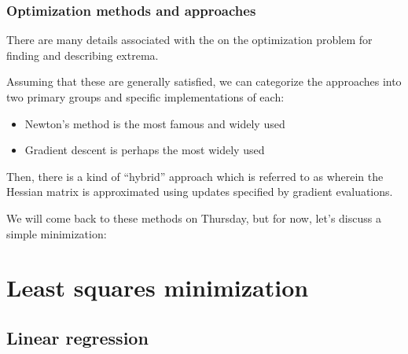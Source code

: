 \documentclass[hyperref={colorlinks=true}]{beamer}
\begin{document}
\begin{frame}%
  \frametitle{Optimization methods and approaches}

  There are many details associated with the  on the optimization problem for finding and describing extrema.
  
  \vspace{0.3cm}
  
  Assuming that these are generally satisfied, we can categorize the approaches into two primary groups and specific implementations of each:
  
  \begin{itemize}
    \item {} Newton's method is the most famous and widely used
    \item {} Gradient descent is perhaps the most widely used 
  \end{itemize}
  
  Then, there is a kind of ``hybrid'' approach which is referred to as  wherein the Hessian matrix is approximated using updates specified by gradient evaluations.
  
  \vspace{0.3cm}
  
  We will come back to these methods on Thursday, but for now, let's discuss a simple minimization: 
  
\end{frame}

\section[Least squares minimization]{Least squares minimization}

\subsection[Linear regression]{Linear regression}
\end{document}
